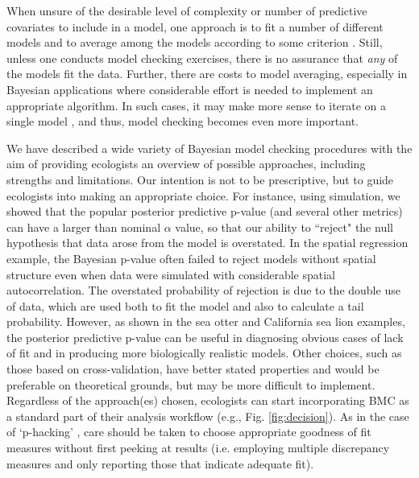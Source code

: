 \documentclass[12pt,english]{article}
\begin{document}
\begin{spacing}{1.9}
When unsure of the desirable level of complexity or number of
predictive covariates to include in a model, one approach is to fit a
number of different models and to average among the models according
to some criterion
\citep[e.g.,][]{Green1995,HoetingEtAl1999,LinkBarker2006}. Still,
unless one conducts model checking exercises, there is no assurance
that \textit{any} of the models fit the data.  Further, there are
costs to model averaging, especially in Bayesian applications where
considerable effort is needed to implement an appropriate algorithm.
In such cases, it may make more sense to iterate on a single model
\citep{VerHoefBoveng2015}, and thus, model checking becomes even more
important.

We have described a wide variety of Bayesian model checking procedures
with the aim of providing ecologists an overview of possible
approaches, including strengths and limitations.  Our intention is not
to be prescriptive, but to guide ecologists into making an appropriate
choice. For instance, using simulation, we showed that the popular
posterior predictive p-value (and several other metrics) can have a larger
than nominal $\alpha$ value, so that our ability to 
``reject" the null hypothesis that data arose from
the model is overstated.  In the spatial regression example, the Bayesian p-value
often failed to reject models without spatial structure even when data
were simulated with considerable spatial autocorrelation.  The
overstated probability of rejection is due to the double use of data, which are used
both to fit the model and also to calculate a tail probability.
However, as shown in the sea otter and California sea lion examples,
the posterior predictive p-value can be useful in diagnosing obvious
cases of lack of fit and in producing more biologically realistic
models.  Other choices, such as those based on cross-validation, have
better stated properties and would be preferable on theoretical
grounds, but may be more difficult to implement.  Regardless of the
approach(es) chosen, ecologists can start incorporating BMC as a
standard part of their analysis workflow (e.g.,
Fig. \ref{fig:decision}). As in the case of `p-hacking' \citep{HeadEtAl2015}, care should be taken
to choose appropriate goodness of fit measures without first peeking
at results (i.e. employing multiple
discrepancy measures and only reporting those that indicate adequate fit).


\end{spacing}
\end{document}
